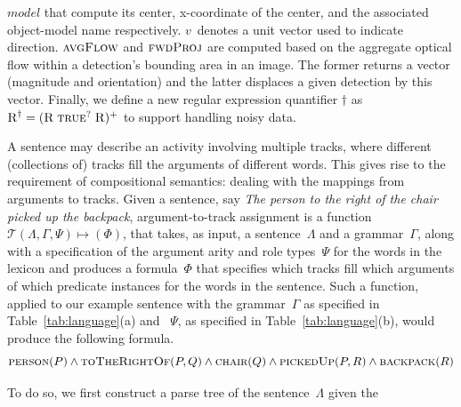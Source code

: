 \begin{table}
{    $model$ that compute its center, x-coordinate of the center, and the
    associated object-model name respectively.
    $v$~denotes a unit vector used to indicate direction.
    $\textsc{avgFlow}$ and $\textsc{fwdProj}$ are computed based on the
    aggregate optical flow within a detection's bounding area in an image.
    The former returns a vector (magnitude and orientation) and the latter
    displaces a given detection by this vector.
    Finally, we define a new regular expression quantifier $\dagger$ as
    $\textsc{R}^\dagger=(\textsc{R}\;\textsc{true}^?\;\textsc{R})^+$ to
    support handling noisy data.
  }
  \label{tab:predicates}
  \vspace*{-3ex}
\end{table}

A sentence may describe an activity involving multiple tracks, where different
(collections of) tracks fill the arguments of different words.
%
This gives rise to the requirement of compositional semantics: dealing with the
mappings from arguments to tracks.
%
Given a sentence, say \emph{The person to the right of the chair picked up the
  backpack}, argument-to-track assignment is a function
$\mathcal{T}(\Lambda,\Gamma,\Psi)\mapsto(\Phi)$, that takes, as input, a
sentence~$\Lambda$ and a grammar~$\Gamma$, along with a specification of the
argument arity and role types~$\Psi$ for the words in the lexicon and produces
a formula~$\Phi$ that specifies which tracks fill which arguments of which
predicate instances for the words in the sentence.
%
Such a function, applied to our example sentence with the grammar~$\Gamma$ as
specified in Table~\ref{tab:language}(a) and ~$\Psi$, as
specified in Table~\ref{tab:language}(b), would produce the following formula.
%
\begin{equation*}
  \textsc{person}(P) \wedge
  \textsc{toTheRightOf}(P,Q)\wedge
  \textsc{chair}(Q) \wedge
  \textsc{pickedUp}(P,R)\wedge
  \textsc{backpack}(R)
\end{equation*}
%
%
\begin{figure}
  \vspace*{-2ex}
  \vspace*{-2ex}
\end{figure}
%
To do so, we first construct a parse tree of the sentence~$\Lambda$ given the
